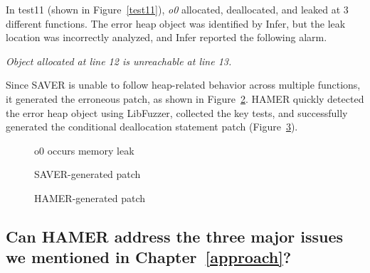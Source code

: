\documentclass[a4paper,11pt,oneside,openany]{book}
\begin{document}
In test11 (shown in Figure~\ref{test11}), {\it o0} allocated, deallocated, and leaked at 3 different functions. The error heap object was identified by Infer, but the leak location was incorrectly analyzed, and Infer reported the following alarm.

\begin{minipage}{\textwidth}
\vspace{0.2cm}
\textsl{\hspace{0.3cm}Object allocated at line 12 is unreachable at line 13.\\}
\end{minipage}
Since SAVER is unable to follow heap-related behavior across multiple functions, it generated the erroneous patch, as shown in Figure~\ref{test11b}. HAMER quickly detected the error heap object using LibFuzzer, collected the key tests, and successfully generated the conditional deallocation statement patch (Figure~\ref{test11c}).

\begin{figure*}[t]
  \begin{subfigure}{0.46\textwidth}
    
    \caption{o0 occurs memory leak}
    \label{test11a}
  \end{subfigure}\hfill
  \begin{subfigure}{0.45\textwidth}
    
    \caption{SAVER-generated patch}
    \label{test11b}
  \end{subfigure}
  \centering
  \begin{subfigure}{0.45\textwidth}
    
    \caption{HAMER-generated patch}
    \label{test11c}
  \end{subfigure}
  \caption{test11} 
  \label{test11}
\end{figure*}

\vspace{0.4cm}
\hspace{-0.7cm}


\subsection[Research Question 2]{Can HAMER address the three major issues we mentioned in Chapter~\ref{approach}? }
\end{document}
